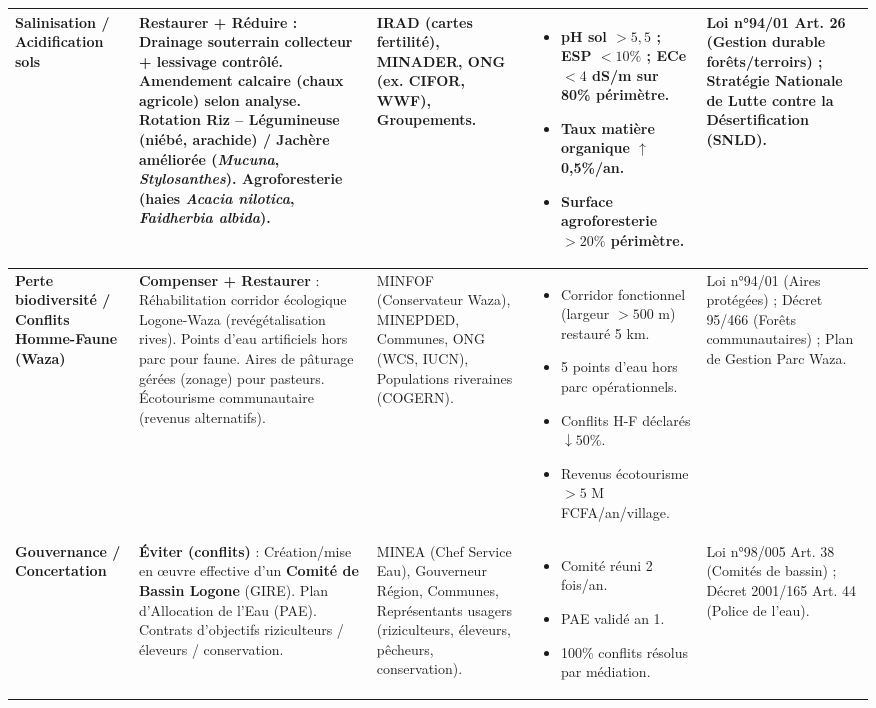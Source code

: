 \documentclass[11pt]{article}
\begin{document}
\begin{exoresolu}
\begin{center}
\begin{tabularx}{\linewidth}{|l|X|l|X|l|}
        \textbf{Salinisation / Acidification sols} & \textbf{Restaurer + Réduire} : Drainage souterrain collecteur + lessivage contrôlé. Amendement calcaire (chaux agricole) selon analyse. Rotation Riz – Légumineuse (niébé, arachide) / Jachère améliorée (\emph{Mucuna}, \emph{Stylosanthes}). Agroforesterie (haies \emph{Acacia nilotica}, \emph{Faidherbia albida}). & IRAD (cartes fertilité), MINADER, ONG (ex. CIFOR, WWF), Groupements. & \begin{itemize}\item pH sol $> 5,5$ ; ESP $< 10\%$ ; ECe $< 4$ dS/m sur 80\% périmètre.\item Taux matière organique $\uparrow$ 0,5\%/an.\item Surface agroforesterie $> 20\%$ périmètre.\end{itemize} & Loi n°94/01 Art. 26 (Gestion durable forêts/terroirs) ; Stratégie Nationale de Lutte contre la Désertification (SNLD). \\ \hline
        \textbf{Perte biodiversité / Conflits Homme-Faune (Waza)} & \textbf{Compenser + Restaurer} : Réhabilitation corridor écologique Logone-Waza (revégétalisation rives). Points d'eau artificiels hors parc pour faune. Aires de pâturage gérées (zonage) pour pasteurs. Écotourisme communautaire (revenus alternatifs). & MINFOF (Conservateur Waza), MINEPDED, Communes, ONG (WCS, IUCN), Populations riveraines (COGERN). & \begin{itemize}\item Corridor fonctionnel (largeur $> 500$ m) restauré 5 km.\item 5 points d'eau hors parc opérationnels.\item Conflits H-F déclarés $\downarrow 50\%$.\item Revenus écotourisme $> 5$ M FCFA/an/village.\end{itemize} & Loi n°94/01 (Aires protégées) ; Décret 95/466 (Forêts communautaires) ; Plan de Gestion Parc Waza. \\ \hline
        \textbf{Gouvernance / Concertation} & \textbf{Éviter (conflits)} : Création/mise en œuvre effective d'un \textbf{Comité de Bassin Logone} (GIRE). Plan d'Allocation de l'Eau (PAE). Contrats d'objectifs riziculteurs / éleveurs / conservation. & MINEA (Chef Service Eau), Gouverneur Région, Communes, Représentants usagers (riziculteurs, éleveurs, pêcheurs, conservation). & \begin{itemize}\item Comité réuni 2 fois/an.\item PAE validé an 1.\item 100\% conflits résolus par médiation.\end{itemize} & Loi n°98/005 Art. 38 (Comités de bassin) ; Décret 2001/165 Art. 44 (Police de l'eau). \\ \hline

\end{tabularx}
\end{center}
\end{exoresolu}
\end{document}
